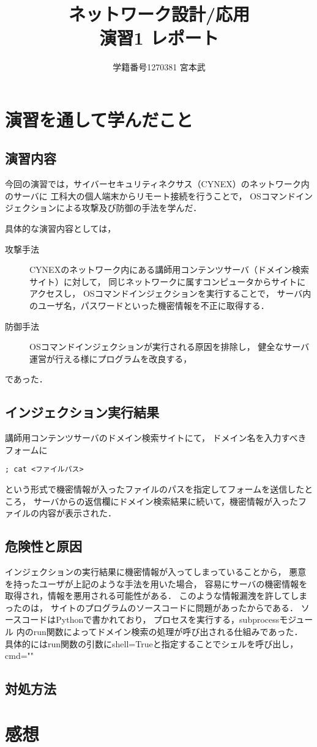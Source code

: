 \documentclass{jlreq}
\title{ネットワーク設計/応用 \\ \vspace{0.3cm} 演習1 レポート}
\author{学籍番号1270381 宮本武}
\begin{document}
\maketitle

\section{演習を通して学んだこと}
\subsection{演習内容}
今回の演習では，サイバーセキュリティネクサス（CYNEX）のネットワーク内のサーバに
工科大の個人端末からリモート接続を行うことで，
OSコマンドインジェクションによる攻撃及び防御の手法を学んだ．

具体的な演習内容としては，
\begin{description}
    \item[攻撃手法]
    CYNEXのネットワーク内にある講師用コンテンツサーバ（ドメイン検索サイト）に対して，
    同じネットワークに属すコンピュータからサイトにアクセスし，
    OSコマンドインジェクションを実行することで，
    サーバ内のユーザ名，パスワードといった機密情報を不正に取得する．

    \vspace{0.3cm}
    \item[防御手法] 
    OSコマンドインジェクションが実行される原因を排除し，
    健全なサーバ運営が行える様にプログラムを改良する，
\end{description}
であった．

\subsection{インジェクション実行結果}
講師用コンテンツサーバのドメイン検索サイトにて，
ドメイン名を入力すべきフォームに
\begin{lstlisting}[frame={tblr}]
; cat <ファイルパス>
\end{lstlisting}
という形式で機密情報が入ったファイルのパスを指定してフォームを送信したところ，
サーバからの返信欄にドメイン検索結果に続いて，機密情報が入ったファイルの内容が表示された．
\subsection{危険性と原因}
インジェクションの実行結果に機密情報が入ってしまっていることから，
悪意を持ったユーザが上記のような手法を用いた場合，
容易にサーバの機密情報を取得され，情報を悪用される可能性がある．
このような情報漏洩を許してしまったのは，
サイトのプログラムのソースコードに問題があったからである．
ソースコードはPythonで書かれており，
プロセスを実行する，subprocessモジュール
内のrun関数によってドメイン検索の処理が呼び出される仕組みであった．
具体的にはrun関数の引数にshell=Trueと指定することでシェルを呼び出し，
cmd=""

\subsection{対処方法}


\section{感想}
\end{document}
